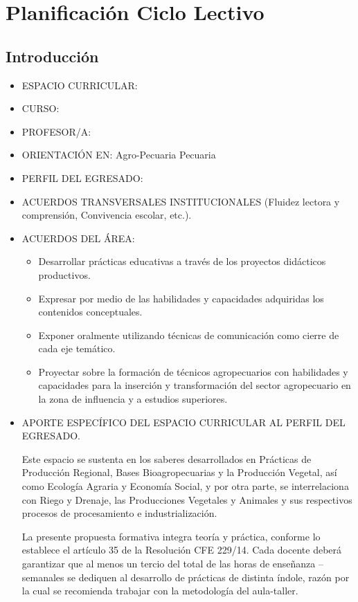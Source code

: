 \documentclass[../main]{subfiles}
\begin{document}
\chapter*{Planificación Ciclo Lectivo \ano}
\section*{Introducción}
\begin{itemize}

  \item ESPACIO CURRICULAR: \materiaLong
  \item CURSO:\curso
  \item PROFESOR/A:\nombre
  \item ORIENTACIÓN EN: Agro-Pecuaria Pecuaria
  \item PERFIL DEL EGRESADO:
  \item ACUERDOS TRANSVERSALES INSTITUCIONALES (Fluidez lectora y
    comprensión, Convivencia escolar, etc.).
  \item ACUERDOS DEL ÁREA:
    \begin{itemize}
      \item Desarrollar prácticas educativas a través de los
        proyectos didácticos productivos.
      \item Expresar por medio de las habilidades y capacidades
        adquiridas los contenidos conceptuales.
      \item Exponer oralmente  utilizando técnicas de comunicación
        como cierre de cada eje temático.
      \item Proyectar sobre la formación de técnicos agropecuarios
        con habilidades y capacidades para la inserción y
        transformación del sector agropecuario en la zona de
        influencia y a estudios superiores.
    \end{itemize}
  \item APORTE ESPECÍFICO DEL ESPACIO CURRICULAR AL PERFIL DEL EGRESADO.

    Este espacio se sustenta en los saberes desarrollados en Prácticas de
    Producción Regional, Bases Bioagropecuarias y la Producción
    Vegetal, así como
    Ecología Agraria y Economía Social, y por otra parte, se
    interrelaciona con Riego y
    Drenaje, las Producciones Vegetales y Animales y sus respectivos procesos de
    procesamiento e industrialización.

    La presente propuesta formativa integra teoría y práctica, conforme lo
    establece el artículo 35 de la Resolución CFE 229/14. Cada
    docente deberá garantizar
    que al menos un tercio del total de las horas de enseñanza
    –semanales se dediquen al
    desarrollo de prácticas de distinta índole, razón por la cual se
    recomienda trabajar con
    la metodología del aula-taller.
\end{itemize}
\end{document}
